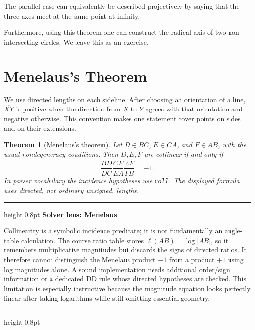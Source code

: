 \documentclass[reqno]{amsart}
\newenvironment{lecturebox}[1]{%
    \par\medskip
    \noindent\begingroup
    \setlength{\parindent}{0pt}
    \color{agblue}\hrule height 0.8pt\color{black}
    \smallskip
    \textbf{\color{agblue}#1}\par\smallskip
}{%
    \smallskip
    \color{agblue}\hrule height 0.8pt\color{black}
    \endgroup
    \medskip
}
\DeclareMathOperator{\1}{\textbf{1}}
\newtheorem{thm}{Theorem}[section]
\begin{document}
The parallel case can equivalently be described projectively by saying that
the three axes meet at the same point at infinity.

Furthermore, using this theorem one can construct the radical axis of two non-intersecting circles. We leave this as an exercise. 


\section{Menelaus's Theorem}\label{sec: Menelaus}
We use directed lengths on each sideline.  After choosing an orientation of a
line, $\overline{XY}$ is positive when the direction from $X$ to $Y$ agrees
with that orientation and negative otherwise.  This convention makes one
statement cover points on sides and on their extensions.

\begin{thm}[Menelaus's theorem]
Let $D\in BC$, $E\in CA$, and $F\in AB$, with the usual nondegeneracy
conditions. Then $D,E,F$ are collinear if and only if
\[
 \frac{\overline{BD}}{\overline{DC}}
 \frac{\overline{CE}}{\overline{EA}}
 \frac{\overline{AF}}{\overline{FB}}=-1.
\]
In parser vocabulary the incidence hypotheses use \verb|coll|.  The displayed
formula uses directed, not ordinary unsigned, lengths.
\end{thm}

\begin{lecturebox}{Solver lens: Menelaus}
Collinearity is a symbolic incidence predicate; it is not fundamentally an
angle-table calculation. The course ratio table stores
$\ell(AB)=\log|AB|$, so it remembers multiplicative magnitudes but discards
the signs of directed ratios. It therefore cannot distinguish the Menelaus
product $-1$ from a product $+1$ using log magnitudes alone. A sound
implementation needs additional order/sign information or a dedicated DD
rule whose directed hypotheses are checked. This limitation is especially
instructive because the magnitude equation looks perfectly linear after
taking logarithms while still omitting essential geometry.
\end{lecturebox}
\end{document}
